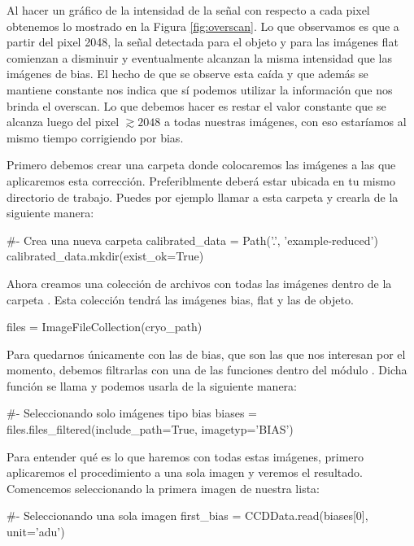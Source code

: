 Al hacer un gráfico de la intensidad de la señal con respecto a cada pixel obtenemos lo mostrado en la Figura \ref{fig:overscan}. Lo que observamos es que a partir del pixel 2048, la señal detectada para el objeto y para las imágenes flat comienzan a disminuir y eventualmente alcanzan la misma intensidad que las imágenes de bias. El hecho de que se observe esta caída y que además se mantiene constante nos indica que sí podemos utilizar la información que nos brinda el overscan. Lo que debemos hacer es restar el valor constante que se alcanza luego del pixel $ \gtrsim 2048 $ a todas nuestras imágenes, con eso estaríamos al mismo tiempo corrigiendo por bias. 

Primero debemos crear una carpeta donde colocaremos las imágenes a las que aplicaremos esta corrección. Preferiblmente deberá estar ubicada en tu mismo directorio de trabajo. Puedes por ejemplo llamar a esta carpeta  y crearla de la siguiente manera:

\begin{pyin}[]
#- Crea una nueva carpeta
calibrated_data = Path('.', 'example-reduced')
calibrated_data.mkdir(exist_ok=True)
\end{pyin}

Ahora creamos una colección de archivos con todas las imágenes dentro de la carpeta . Esta colección tendrá las imágenes bias, flat y las de objeto.
\begin{pyin}
files = ImageFileCollection(cryo_path)
\end{pyin}

Para quedarnos únicamente con las de bias, que son las que nos interesan por el momento, debemos filtrarlas con una de las funciones dentro del módulo . Dicha función se llama  y podemos usarla de la siguiente manera:

\begin{pyin}[]
#- Seleccionando solo imágenes tipo bias
biases = files.files_filtered(include_path=True, imagetyp='BIAS')
\end{pyin}

Para entender qué es lo que haremos con todas estas imágenes, primero aplicaremos el procedimiento a una sola imagen y veremos el resultado. Comencemos seleccionando la primera imagen de nuestra lista:

\begin{pyin}[]
#- Seleccionando una sola imagen
first_bias = CCDData.read(biases[0], unit='adu')
\end{pyin}

